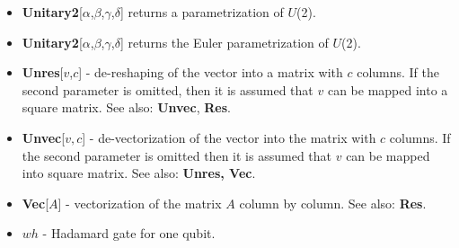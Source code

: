 \documentclass[a4paper,10pt]{scrartcl}
\begin{document}
\begin{itemize}
\item  \textbf{Unitary2}[$\alpha$,$\beta$,$\gamma$,$\delta$] returns a parametrization of $U$(2).
\item  \textbf{Unitary2}[$\alpha$,$\beta$,$\gamma$,$\delta$] returns the Euler parametrization of $U$(2).
\item  \textbf{Unres}[$v$,$c$] - de-reshaping of the vector into a matrix with $c$ columns. If the second parameter is omitted, then it is assumed that $v$ can be mapped into a square matrix. See also: \textbf{Unvec}, \textbf{Res}.
\item  \textbf{Unvec}[$v,c$] - de-vectorization of the vector into the matrix with $c$ columns. If the second parameter is omitted then it is assumed that $v$ can be mapped into square matrix. See also: \textbf{Unres, Vec}.
\item  \textbf{Vec}[$A$] - vectorization of the matrix $A$ column by column. See also: \textbf{Res}.
\item  $wh$ - Hadamard gate for one qubit.
\end{itemize} 
\end{document}

